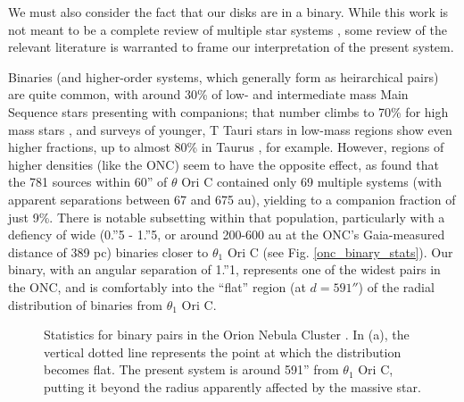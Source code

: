 We must also consider the fact that our disks are in a binary. While this work is not meant to be a complete review of multiple star systems \citep[for a more comprehensive review, see][]{Duchene2013}, some review of the relevant literature is warranted to frame our interpretation of the present system.

Binaries (and higher-order systems, which generally form as heirarchical pairs) are quite common, with around 30\% of low- and intermediate mass Main Sequence stars presenting with companions; that number climbs to 70\% for high mass stars \citep{Sana2012}, and surveys of younger, T Tauri stars in low-mass regions show even higher fractions, up to almost 80\% in Taurus \citep{Kraus2011}, for example. However, regions of higher densities (like the ONC) seem to have the opposite effect, as \citet{Reipurth2007} found that the 781 sources within 60'' of $\theta$ Ori C contained only 69 multiple systems (with apparent separations between 67 and 675 au), yielding to a companion fraction of just 9\%. There is notable subsetting within that population, particularly with a defiency of wide (0.''5 - 1.''5, or around 200-600 au at the ONC's Gaia-measured distance of 389 pc) binaries closer to $\theta_1$ Ori C (see Fig. \ref{onc_binary_stats}). Our binary, with an angular separation of 1.''1, represents one of the widest pairs in the ONC, and is comfortably into the ``flat'' region (at $d = 591''$) of the radial distribution of binaries from $\theta_1$ Ori C.





\begin{figure}[h]
  \hspace*{\fill}%
  \hspace*{\fill}%
  \caption{Statistics for binary pairs in the Orion Nebula Cluster \citep{Reipurth2007}. In (a), the vertical dotted line represents the point at which the distribution becomes flat. The present system is around 591'' from $\theta_1$ Ori C, putting it beyond the radius apparently affected by the massive star.}
  \label{fig:onc_binary_stats}
\end{figure}




